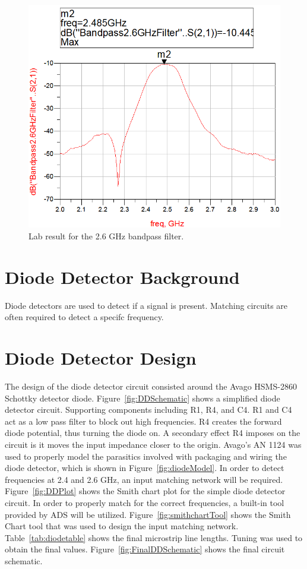 \documentclass[conference]{IEEEtran}
\begin{document}
\begin{figure}[!htb]
\centering
\includegraphics[scale=0.35]{bandpass-pics/bpf26.png}
\caption{Lab result for the 2.6 GHz bandpass filter.}
\label{fig:bpf26}
\end{figure}

\section{Diode Detector Background}
Diode detectors are used to detect if a signal is present.  Matching circuits are often required to detect a specifc frequency.

\section{Diode Detector Design}
The design of the diode detector circuit consisted around the Avago HSMS-2860 Schottky detector diode.  Figure~\ref{fig:DDSchematic} shows a simplified diode detector circuit.  Supporting components including R1, R4, and C4.  R1 and C4 act as a low pass filter to block out high frequencies.  R4 creates the forward diode potential, thus turning the diode on.  A secondary effect R4 imposes on the circuit is it moves the input impedance closer to the origin.  Avago's AN 1124\cite{an1124} was used to properly model the parasitics involved with packaging and wiring the diode detector, which is shown in Figure~\ref{fig:diodeModel}.  In order to detect frequencies at 2.4 and 2.6 GHz, an input matching network will be required.  Figure~\ref{fig:DDPlot} shows the Smith chart plot for the simple diode detector circuit.  In order to properly match for the correct frequencies, a built-in tool provided by ADS will be utilized.  Figure~\ref{fig:smithchartTool} shows the Smith Chart tool that was used to design the input matching network.  Table~\ref{tab:diodetable} shows the final microstrip line lengths.  Tuning was used to obtain the final values.  Figure~\ref{fig:FinalDDSchematic} shows the final circuit schematic.  
\end{document}
